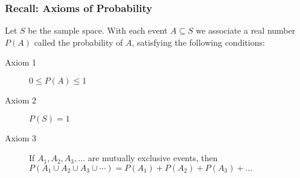 %
\begin{frame}
\frametitle{Recall: Axioms of Probability}

Let $S$ be the sample space. With each event $A \subseteq S$ we associate a real number $P(A)$ called the \alert{probability of $A$}, satisfying the following conditions:
\vspace{1em}
\begin{description}
	\item[Axiom 1] $0 \leq P(A) \leq 1$ 
	\item[Axiom 2] $P(S)=1$
	\item[Axiom 3] If $A_1, A_2, A_3, \hdots$ are mutually exclusive events, then $P(A_1\cup A_2 \cup A_3 \cup \cdots) = P(A_1) + P(A_2) + P(A_3) + \hdots$
\end{description}

\end{frame}
